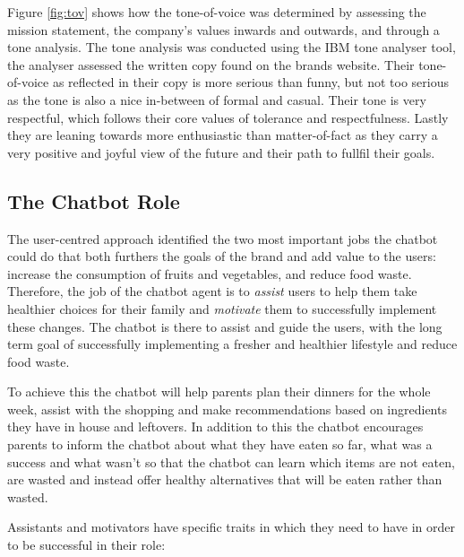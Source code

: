         Figure \ref{fig:tov} shows how the tone-of-voice was determined by assessing the mission statement, the company's values inwards and outwards, and through a tone analysis. The tone analysis was conducted using the IBM tone analyser tool, the analyser assessed the written copy found on the brands website. Their tone-of-voice as reflected in their copy is more serious than funny, but not too serious as the tone is also a nice in-between of formal and casual. Their tone is very respectful, which follows their core values of tolerance and respectfulness. Lastly they are leaning towards more enthusiastic than matter-of-fact as they carry a very positive and joyful view of the future and their path to fullfil their goals.

\vspace{5mm}

    \subsection{The Chatbot Role}
    
    The user-centred approach identified the two most important jobs the chatbot could do that both furthers the goals of the brand and add value to the users: increase the consumption of fruits and vegetables, and reduce food waste. Therefore, the job of the chatbot agent is to \textit{assist} users to help them take healthier choices for their family and \textit{motivate} them to successfully implement these changes. The chatbot is there to assist and guide the users, with the long term goal of successfully implementing a fresher and healthier lifestyle and reduce food waste. 
    
    To achieve this the chatbot will help parents plan their dinners for the whole week, assist with the shopping and make recommendations based on ingredients they have in house and leftovers. In addition to this the chatbot encourages parents to inform the chatbot about what they have eaten so far, what was a success and what wasn’t so that the chatbot can learn which items are not eaten, are wasted and instead offer healthy alternatives that will be eaten rather than wasted. 
    
    Assistants and motivators have specific traits in which they need to have in order to be successful in their role:
    
\vspace{2,5mm}
    
